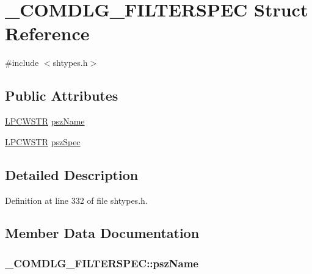 \hypertarget{struct___c_o_m_d_l_g___f_i_l_t_e_r_s_p_e_c}{}\section{\+\_\+\+C\+O\+M\+D\+L\+G\+\_\+\+F\+I\+L\+T\+E\+R\+S\+P\+EC Struct Reference}
\label{struct___c_o_m_d_l_g___f_i_l_t_e_r_s_p_e_c}


{\ttfamily \#include $<$shtypes.\+h$>$}

\subsection*{Public Attributes}
\begin{DoxyCompactItemize}
\item 
\hyperlink{mapinls_8h_a25fda90f83ded0efd5456a4e7eda1e0c}{L\+P\+C\+W\+S\+TR} \hyperlink{struct___c_o_m_d_l_g___f_i_l_t_e_r_s_p_e_c_a0cc64acfe1eb06651a386871c78d2a24}{psz\+Name}
\item 
\hyperlink{mapinls_8h_a25fda90f83ded0efd5456a4e7eda1e0c}{L\+P\+C\+W\+S\+TR} \hyperlink{struct___c_o_m_d_l_g___f_i_l_t_e_r_s_p_e_c_a734081de2ba5e0f4ef60cdbd84ff6629}{psz\+Spec}
\end{DoxyCompactItemize}


\subsection{Detailed Description}


Definition at line 332 of file shtypes.\+h.



\subsection{Member Data Documentation}
\subsubsection[{\texorpdfstring{psz\+Name}{pszName}}]{ \+\_\+\+C\+O\+M\+D\+L\+G\+\_\+\+F\+I\+L\+T\+E\+R\+S\+P\+E\+C\+::psz\+Name}\hypertarget{struct___c_o_m_d_l_g___f_i_l_t_e_r_s_p_e_c_a0cc64acfe1eb06651a386871c78d2a24}{}\label{struct___c_o_m_d_l_g___f_i_l_t_e_r_s_p_e_c_a0cc64acfe1eb06651a386871c78d2a24}


